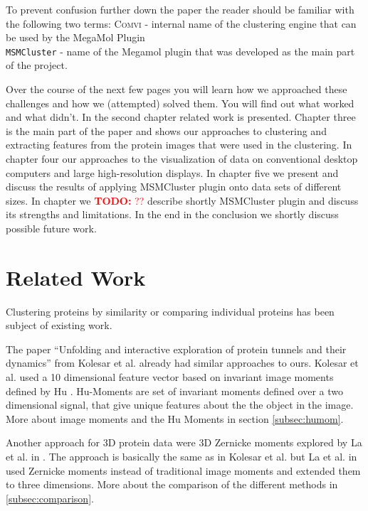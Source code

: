 \documentclass[journal]{vgtc}       %
\newcommand{\todo}[1]{\textcolor{red}{\textbf{TODO:} #1}}
\begin{document}
To prevent confusion further down the paper  the reader should be familiar with the following two terms: \textsc{Comvi} - internal name of the clustering engine that can be used by the MegaMol Plugin \\
\verb|MSMCluster| - name of the Megamol plugin that was developed as the main part of the project.

Over the course of the next few pages you will learn how we approached these challenges and how we (attempted) solved them. You will find out what  worked and what didn't. In the second chapter related work is presented. Chapter three is the main part of the paper and shows our approaches to clustering and extracting features from the protein images that were used in the clustering. In chapter four our approaches to the visualization of data on conventional desktop computers and large high-resolution displays. In chapter five we present and discuss the results of applying MSMCluster plugin onto data sets of different sizes. In chapter we \todo{??} describe shortly MSMCluster plugin and discuss its strengths and limitations. In the end in the conclusion we shortly discuss possible future work.


\section{Related Work}\label{sec:relatedWork}

Clustering proteins by similarity or comparing individual proteins has been subject of existing work.

The paper ``Unfolding and interactive exploration of protein tunnels and their dynamics'' \cite{kolesar} from Kolesar et al.  already had similar approaches to ours. Kolesar et al. used a 10 dimensional feature vector based on invariant image moments defined by Hu \cite{humoments}. Hu-Moments are set of invariant moments defined over a two dimensional signal, that give unique features about the the object in the image. More about image moments and the Hu Moments in section \ref{subsec:humom}.


Another approach for 3D protein data were 3D Zernicke moments explored by La et al. in \cite{3dsurfer}. The approach is basically the same as in Kolesar et al. but La et al.  in \cite{3dsurfer} used Zernicke moments instead of traditional image moments and extended them to three dimensions. More about the comparison of the different methods in \ref{subsec:comparison}.
 
\end{document}
